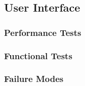 
\subsection{User Interface}
\label{sec:verification_ui}


\subsubsection{Performance Tests}
\label{sec:ui_pt}

\subsubsection{Functional Tests}
\label{sec:ui_ft}

\subsubsection{Failure Modes}
\label{sec:ui_fm}
